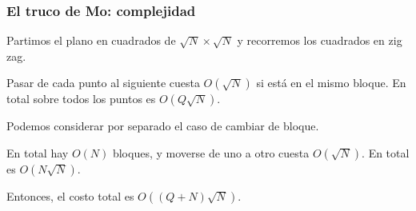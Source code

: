 \begin{frame}
  \frametitle{El truco de Mo: complejidad}

  Partimos el plano en cuadrados de \(\sqrt{N} \times \sqrt{N}\) y recorremos los cuadrados en zig zag.

  \vspace{0.75em}

  Pasar de cada punto al siguiente cuesta \(O(\sqrt{N})\) si está en el mismo bloque. En total sobre todos los puntos es \(O(Q\sqrt{N})\).

  \vspace{0.75em}

  Podemos considerar por separado el caso de cambiar de bloque.

  En total hay \(O(N)\) bloques, y moverse de uno a otro cuesta \(O(\sqrt{N})\). En total es \(O(N\sqrt{N})\).

  \vspace{0.75em}

  Entonces, el costo total es \(O((Q + N)\sqrt{N})\).
\end{frame}
